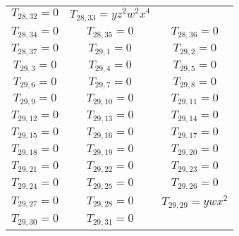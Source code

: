 \documentclass[12pt]{memoireuqam1.3}
\begin{document}
\begin{longtable}{|c|c|c|}
$T_{28,32}= 0$&

$T_{28,33}= yz^2w^2x^4$\\

$T_{28,34}= 0$&

$T_{28,35}= 0$&

$T_{28,36}= 0$\\

$T_{28,37}= 0$&

$T_{29,1}= 0$&

$T_{29,2}= 0$\\

$T_{29,3}= 0$&

$T_{29,4}= 0$&

$T_{29,5}= 0$\\

$T_{29,6}= 0$&

$T_{29,7}= 0$&

$T_{29,8}= 0$\\

$T_{29,9}= 0$&

$T_{29,10}= 0$&

$T_{29,11}= 0$\\

$T_{29,12}= 0$&

$T_{29,13}= 0$&

$T_{29,14}= 0$\\

$T_{29,15}= 0$&

$T_{29,16}= 0$&

$T_{29,17}= 0$\\

$T_{29,18}= 0$&

$T_{29,19}= 0$&

$T_{29,20}= 0$\\

$T_{29,21}= 0$&

$T_{29,22}= 0$&

$T_{29,23}= 0$\\

$T_{29,24}= 0$&

$T_{29,25}= 0$&

$T_{29,26}= 0$\\

$T_{29,27}= 0$&

$T_{29,28}= 0$&

$T_{29,29}= ywx^2$\\

$T_{29,30}= 0$&

$T_{29,31}= 0$&


\end{longtable}
\end{document}
